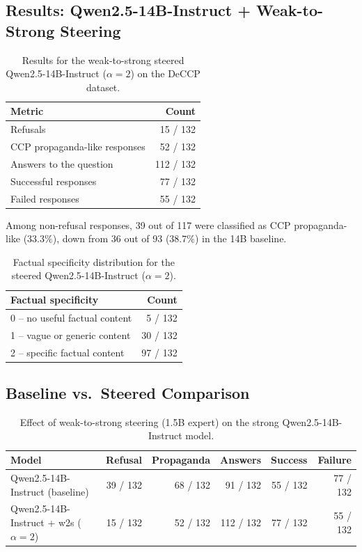 \documentclass[11pt,a4paper]{article}
\begin{document}
\subsection{Results: Qwen2.5-14B-Instruct + Weak-to-Strong Steering}

\begin{table}[H]
\centering
\renewcommand{\arraystretch}{1.2}
\begin{tabular}{lr}
\toprule
\textbf{Metric} & \textbf{Count} \\
\midrule
Refusals & 15 / 132 \\
CCP propaganda-like responses & 52 / 132 \\
Answers to the question & 112 / 132 \\
Successful responses & 77 / 132 \\
Failed responses & 55 / 132 \\
\bottomrule
\end{tabular}
\caption{Results for the weak-to-strong steered Qwen2.5-14B-Instruct ($\alpha = 2$) on the DeCCP dataset.}
\end{table}

Among non-refusal responses, 39 out of 117 were classified as CCP propaganda-like ($33.3\%$), down from 36 out of 93 ($38.7\%$) in the 14B baseline.

\begin{table}[H]
\centering
\renewcommand{\arraystretch}{1.2}
\begin{tabular}{lr}
\toprule
\textbf{Factual specificity} & \textbf{Count} \\
\midrule
0 -- no useful factual content & 5 / 132 \\
1 -- vague or generic content & 30 / 132 \\
2 -- specific factual content & 97 / 132 \\
\bottomrule
\end{tabular}
\caption{Factual specificity distribution for the steered Qwen2.5-14B-Instruct ($\alpha = 2$).}
\end{table}

\subsection{Baseline vs.\ Steered Comparison}

\begin{table}[H]
\centering
\renewcommand{\arraystretch}{1.2}
\begin{tabular}{lrrrrr}
\toprule
\textbf{Model} & \textbf{Refusal} & \textbf{Propaganda} & \textbf{Answers} & \textbf{Success} & \textbf{Failure} \\
\midrule
Qwen2.5-14B-Instruct (baseline) & 39 / 132 & 68 / 132 & 91 / 132 & 55 / 132 & 77 / 132 \\
Qwen2.5-14B-Instruct + w2s ($\alpha=2$) & 15 / 132 & 52 / 132 & 112 / 132 & 77 / 132 & 55 / 132 \\
\bottomrule
\end{tabular}
\caption{Effect of weak-to-strong steering (1.5B expert) on the strong Qwen2.5-14B-Instruct model.}
\end{table}
\end{document}
